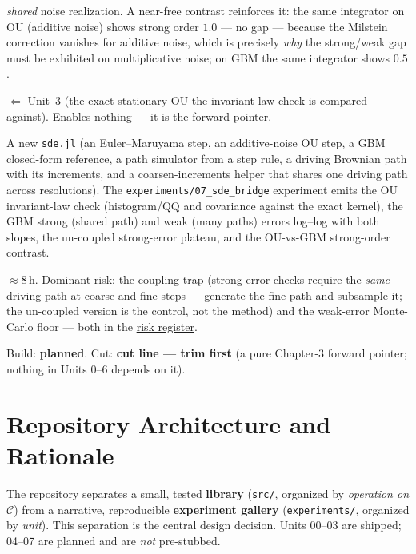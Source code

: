 \documentclass[11pt]{article}
\newenvironment{brief}{%
  \begin{description}[style=sameline,leftmargin=2.3cm,font=\bfseries\color{hubblue}]
}{%
  \end{description}
}
\begin{document}
\begin{brief}
\emph{shared} noise realization. A near-free contrast reinforces it: the same integrator on OU
(additive noise) shows strong order $1.0$ --- no gap --- because the Milstein correction vanishes for
additive noise, which is precisely \emph{why} the strong/weak gap must be exhibited on multiplicative
noise; on GBM the same integrator shows $0.5$.
\item[Depends on / enables] $\Leftarrow$ Unit~3 (the exact stationary OU the invariant-law check is
compared against). Enables nothing --- it is the forward pointer.
\item[Deliverable shape] A new \texttt{sde.jl} (an Euler--Maruyama step, an additive-noise OU step, a
GBM closed-form reference, a path simulator from a step rule, a driving Brownian path with its
increments, and a coarsen-increments helper that shares one driving path across resolutions). The
\texttt{experiments/07\_sde\_bridge} experiment emits the OU invariant-law check (histogram/QQ and
covariance against the exact kernel), the GBM strong (shared path) and weak (many paths) errors
log--log with both slopes, the un-coupled strong-error plateau, and the OU-vs-GBM strong-order
contrast.
\item[Effort \& risk] $\approx 8$\,h. Dominant risk: the coupling trap (strong-error checks require
the \emph{same} driving path at coarse and fine steps --- generate the fine path and subsample it; the
un-coupled version is the control, not the method) and the weak-error Monte-Carlo floor --- both in
the \hyperref[sec:risk]{risk register}.
\item[Status] Build: \textbf{planned}. Cut: \textbf{cut line --- trim first} (a pure Chapter-3
forward pointer; nothing in Units 0--6 depends on it).
\end{brief}

\section{Repository Architecture and Rationale}

The repository separates a small, tested \textbf{library} (\texttt{src/}, organized by
\emph{operation on $\mathcal{C}$}) from a narrative, reproducible \textbf{experiment gallery}
(\texttt{experiments/}, organized by \emph{unit}). This separation is the central design decision.
Units 00--03 are shipped; 04--07 are planned and are \emph{not} pre-stubbed.
\end{document}
